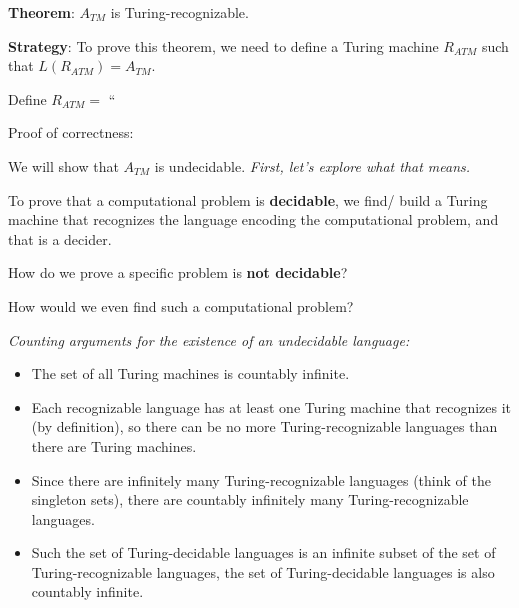 \documentclass[12pt, oneside]{article}
\begin{document}
    {\bf  Theorem}: $A_{TM}$  is  Turing-recognizable.
    
    
    {\bf  Strategy}:  To prove this theorem, we need  to  define  a Turing  machine  $R_{ATM}$ such that 
    $L(R_{ATM}) = A_{TM}$.
    
    
    Define $R_{ATM} =  $ ``
    
    \vspace{150pt}
    
    
    Proof of correctness: 
    
    
    \vfill
    \vfill
    
    We will show that $A_{TM}$ is undecidable.   {\it First, let's explore what that means.}
    
    








    


    


    
    To prove that a computational problem is {\bf decidable}, we find/ build a Turing 
    machine that recognizes the language encoding the computational problem, and that 
    is a decider.
    
    
    How do we prove a specific problem is {\bf not decidable}?
    
    How would we even find such a computational problem?
    
    
    {\it Counting arguments for the existence of an undecidable language:}
    \begin{itemize}
        \item The set of all Turing machines is countably infinite.
        \item Each recognizable language has at least one Turing machine that recognizes it (by definition), 
        so there can be no more Turing-recognizable
        languages than there are Turing machines. 
        \item Since there are infinitely many Turing-recognizable languages
        (think of the singleton sets), there are countably infinitely 
        many Turing-recognizable languages.
        \item Such the set of Turing-decidable languages is an infinite subset 
        of the set of Turing-recognizable languages, the set of 
        Turing-decidable languages is also countably infinite.
    \end{itemize}
    
\end{document}
